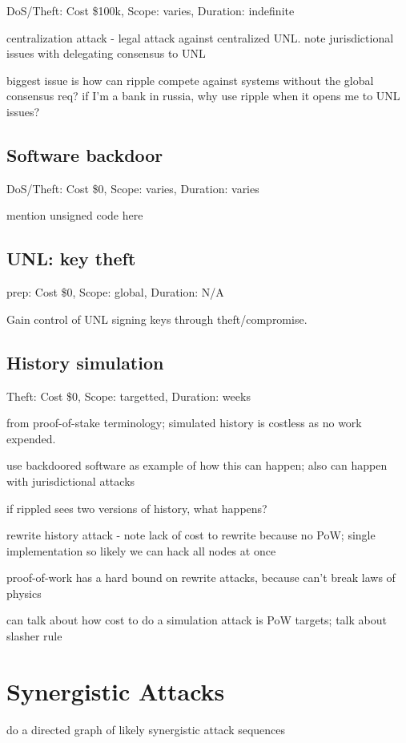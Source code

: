 \documentclass{article}
\begin{document}
DoS/Theft: Cost \$100k, Scope: varies, Duration: indefinite

centralization attack - legal attack against centralized UNL. note
jurisdictional issues with delegating consensus to UNL

biggest issue is how can ripple compete against systems without the global
consensus req? if I'm a bank in russia, why use ripple when it opens me to UNL
issues?


\subsection{Software backdoor}

DoS/Theft: Cost \$0, Scope: varies, Duration: varies

mention unsigned code here


\subsection{UNL: key theft}

prep: Cost \$0, Scope: global, Duration: N/A

Gain control of UNL signing keys through theft/compromise. 


\subsection{History simulation}

Theft: Cost \$0, Scope: targetted, Duration: weeks

from proof-of-stake terminology; simulated history is costless as no work
expended.

use backdoored software as example of how this can happen; also can happen with
jurisdictional attacks

if rippled sees two versions of history, what happens?

rewrite history attack - note lack of cost to rewrite because no PoW; single
implementation so likely we can hack all nodes at once

proof-of-work has a hard bound on rewrite attacks, because can't break laws of
physics

can talk about how cost to do a simulation attack is PoW targets; talk about slasher rule


\section{Synergistic Attacks}

do a directed graph of likely synergistic attack sequences




\end{document}
